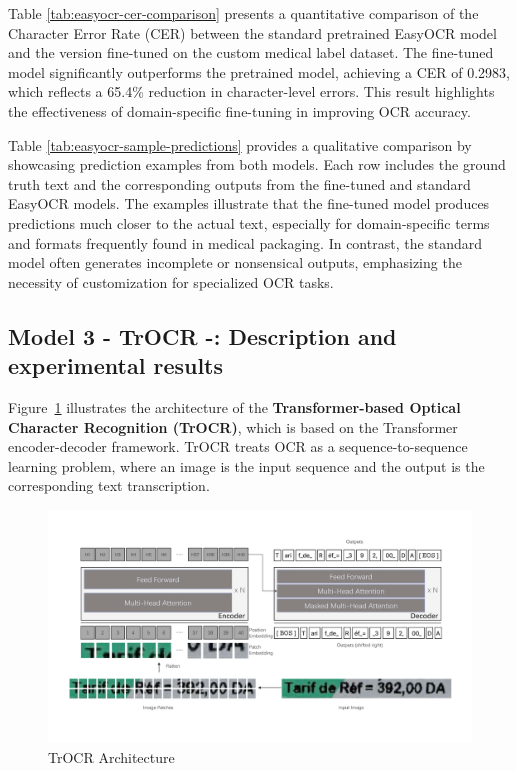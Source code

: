 Table \ref{tab:easyocr-cer-comparison} presents a quantitative comparison of the Character Error Rate (CER) between the standard pretrained EasyOCR model and the version fine-tuned on the custom medical label dataset. The fine-tuned model significantly outperforms the pretrained model, achieving a CER of 0.2983, which reflects a 65.4\% reduction in character-level errors. This result highlights the effectiveness of domain-specific fine-tuning in improving OCR accuracy.

Table \ref{tab:easyocr-sample-predictions} provides a qualitative comparison by showcasing prediction examples from both models. Each row includes the ground truth text and the corresponding outputs from the fine-tuned and standard EasyOCR models. The examples illustrate that the fine-tuned model produces predictions much closer to the actual text, especially for domain-specific terms and formats frequently found in medical packaging. In contrast, the standard model often generates incomplete or nonsensical outputs, emphasizing the necessity of customization for specialized OCR tasks.

\subsection{Model 3 - TrOCR -: Description and experimental results}

Figure~\ref{fig:TrOCRArchitecture} illustrates the architecture of the \textbf {Transformer-based Optical Character Recognition (TrOCR)}, which is based on the Transformer encoder-decoder framework. TrOCR treats OCR as a sequence-to-sequence learning problem, where an image is the input sequence and the output is the corresponding text transcription.


\begin{figure}[H]
    \centering
    \includegraphics[width=1.10\textwidth]{Figures/Chapter 3/trocr_architecture.png}
    \caption{TrOCR Architecture}
    \label{fig:TrOCRArchitecture}
\end{figure}


